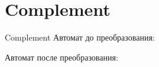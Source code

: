 \section{Complement}
\begin{frame}{Complement}
	Автомат до преобразования:


	Автомат после преобразования:


\end{frame}
